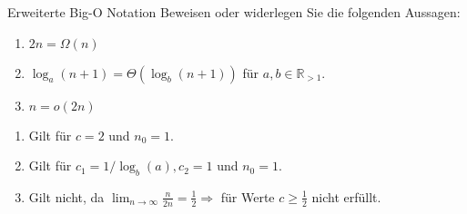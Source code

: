 \documentclass{article}
\begin{document}
\begin{exercise}{Erweiterte Big-O Notation}
  Beweisen oder widerlegen Sie die folgenden Aussagen:
  \begin{enumerate}
    \item $2n = \Omega(n)$
    \item $\log_a(n+1) = \Theta(\log_b(n+1))$ für $a,b \in \mathbb{R}_{>1}$.
    \item $n = o(2n)$
  \end{enumerate}

  \begin{solution}
    \begin{enumerate}
      \item Gilt für $c = 2$ und $n_0 = 1$.
      \item Gilt für $c_1=1/\log_b(a), c_2=1$ und $n_0 = 1$.
      \item Gilt nicht, da $\lim_{n\to\infty} \frac{n}{2n} = \frac{1}{2} \Rightarrow $ für Werte $c\geq\frac{1}{2}$ nicht erfüllt.
    \end{enumerate}
  \end{solution}
\end{exercise}
\end{document}
